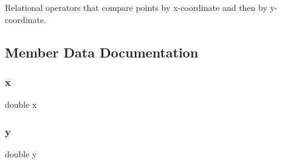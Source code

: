 Relational operators that compare points by x-\/coordinate and then by y-\/coordinate. 



\subsection{Member Data Documentation}
\mbox{\label{structGPoint_af88b946fb90d5f08b5fb740c70e98c10}} 
\subsubsection{\texorpdfstring{x}{x}}
{\footnotesize\ttfamily double x}

\mbox{\label{structGPoint_ab927965981178aa1fba979a37168db2a}} 
\subsubsection{\texorpdfstring{y}{y}}
{\footnotesize\ttfamily double y}

